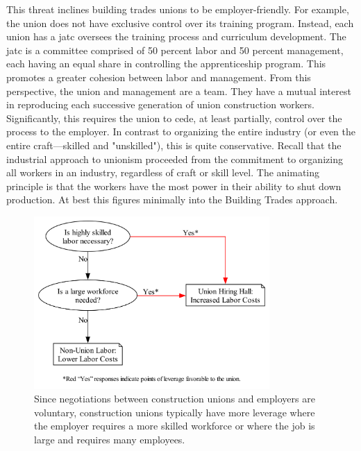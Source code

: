 \documentclass[12pt]{article}
\newcommand{\imageWidth}{0.8\textwidth}
\begin{document}
This threat inclines building trades unions to be employer-friendly. For example, the union does not have exclusive control over its training program. Instead, each union has a \acrfull{jatc} oversees the training process and curriculum development. The \acrshort{jatc} is a committee comprised of 50 percent labor and 50 percent management, each having an equal share in controlling the apprenticeship program. This promotes a greater cohesion between labor and management. From this perspective, the union and management are a team. They have a mutual interest in reproducing each successive generation of union construction workers. Significantly, this requires the union to cede, at least partially, control over the process to the employer. In contrast to organizing the entire industry (or even the entire craft---skilled and "unskilled"), this is quite conservative. Recall that the industrial approach to unionism proceeded from the commitment to organizing all workers in an industry, regardless of craft or skill level. The animating principle is that the workers have the most power in their ability to shut down production. At best this figures minimally into the Building Trades approach.

\begin{figure}[ht]
  \centering
  \includegraphics[width=\imageWidth]{images/union_power_red}
  \captionsetup{justification=centering, singlelinecheck=false, margin=2cm} 
  \caption[Union Leverage and Power]{Since negotiations between construction unions and employers are voluntary, construction unions typically have more leverage where the employer requires a more skilled workforce or where the job is large and requires many employees.}
  \label{fig:union_power_red}
\end{figure}
\end{document}
